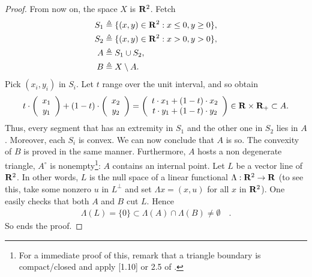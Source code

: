 \begin{proof}
%
From now on, the space $X$ is ${\mathbf R}^2$. Fetch %
%
   \begin{align}
     S_1 & \triangleq \{(x, y )\in {\mathbf R}^2: x\leq 0, y \geq 0\}, \\
     S_2 & \triangleq \{(x, y )\in {\mathbf R}^2: x>0, y > 0\}, \\
     A   & \triangleq S_1\cup S_2, \\
     B   & \triangleq X\setminus A.
   \end{align}
%
Pick $(x_i, y_i)$ in $S_i$. %
Let $t$ range over the unit interval, and so obtain %
%
  \begin{align}
    t\cdot  \left(\begin{array}{c}x_1 \\y_1\end{array}\right)+
    (1-t)  \cdot \left(\begin{array}{c}x_2 \\ y_2\end{array}\right)= 
    \left(\begin{array}{c}t\cdot x_1+(1-t)\cdot x_2 \\t\cdot y_1 + (1-t)\cdot y_2\end{array}\right)
    \in {\mathbf R}\times {\mathbf R}_+\subset A.
  \end{align}
%
Thus, every segment that has an extremity in $S_1$ and the other one in $S_2$ %
lies in $A$. %
Moreover, each $S_i$ is convex. We can now conclude that $A$ is so. %
The convexity of $B$ is proved in the same manner. Furthermore, %
$A$ hosts a non degenerate triangle, \ie $A^{\circ}$ is nonempty\footnote{%
%
  For a immediate proof of this, remark that a triangle boundary is %
  compact/closed and apply [1.10] or 2.5 of \cite{BigRudin}.
}: %
$A$ contains an internal point. %
%
\newline\newline\noindent
%
Let $L$ be a vector line of ${\mathbf R}^2$. %
In other words, $L$ is the null space of a linear functional %
%
  $\Lambda: {\mathbf R}^2\to {\mathbf R}$ %
%
(to see this, take some nonzero $u$ in $L^\bot$ and set %
%
  $\Lambda x= (x,u)$ %
%
for all $x$ in ${\mathbf R}^2$). One easily checks that both $A$ and $B$ cut $L$. %
Hence %
%
  \begin{align}
    \Lambda (L)=\{0\}\subset \Lambda (A)\cap \Lambda (B)\neq\emptyset\quad.
    \end{align}
%
So ends the proof.
\end{proof}
